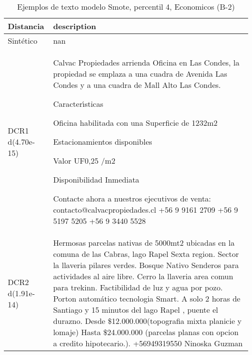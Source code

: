 \begin{table}[H]
\centering
\fontsize{10}{14}\selectfont
\caption{Ejemplos de texto modelo Smote, percentil 4, Economicos (B-2)}
\label{table-example-economicos-b-2-smote-enc-4p-text}
\begin{tabular}{|l|m{35em}|}
\hline
\rowcolor[gray]{0.8}
Distancia & description \\
\hline Sintético & nan \\
\hline DCR1 d(4.70e-15) & Calvac Propiedades arrienda Oficina en Las Condes, la propiedad se emplaza a una cuadra de Avenida Las
Condes y a una cuadra de Mall Alto Las Condes.

 Caracter{\'\i}sticas 

Oficina habilitada con una Superficie de 1232m2

Estacionamientos disponibles

Valor UF0,25 /m2

Disponibilidad Inmediata

Contacte ahora a nuestros ejecutivos de venta:
contacto@calvacpropiedades.cl
+56 9 9161 2709
+56 9 5197 5205
+56 9 3440 5528

  \\
\hline DCR2 d(1.91e-14) & Hermosas parcelas nativas de 5000mt2 ubicadas en la comuna de las Cabras, lago Rapel Sexta region. Sector la llaveria pilares verdes. Bosque Nativo Senderos para actividades al aire libre. Cerro la llaveria area comun para trekinn. Factibilidad de luz y agua por pozo. Porton autom\'atico tecnologia Smart. A solo 2 horas de Santiago y 15 minutos del lago Rapel , puente el durazno. Desde \$12.000.000(topografia mixta planicie y lomaje) Hasta \$24.000.000 (parcelas planas con opcion a credito hipotecario.). +56949319550 Ninoska Guzman \\
\hline
\end{tabular}
\end{table}

